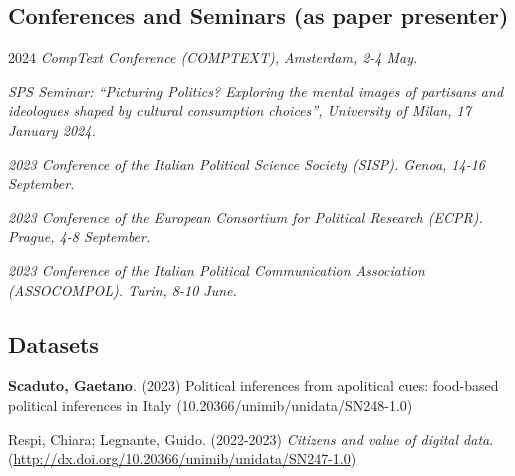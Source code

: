 \documentclass[8pt,]{article}
\providecommand{\tightlist}{%
  \setlength{\itemsep}{0pt}\setlength{\parskip}{0pt}}
\renewenvironment{itemize}{
  \begin{list}{}{
    \setlength{\leftmargin}{1.5em}
  }
}{
  \end{list}
}
\begin{document}
\hypertarget{conferences-and-seminars-as-paper-presenter}{%
\subsection{Conferences and Seminars (as paper
presenter)}\label{conferences-and-seminars-as-paper-presenter}}

\begin{itemize}
\tightlist
\item
  2024 \emph{CompText Conference (COMPTEXT), Amsterdam, 2-4 May.}
\end{itemize}

\begin{itemize}
\tightlist
\item
  \emph{SPS Seminar: ``Picturing Politics? Exploring the mental images
  of partisans and ideologues shaped by cultural consumption choices'',
  University of Milan, 17 January 2024.}
\end{itemize}

\begin{itemize}
\tightlist
\item
  \emph{2023 Conference of the Italian Political Science Society (SISP).
  Genoa, 14-16 September.}
\end{itemize}

\begin{itemize}
\tightlist
\item
  \emph{2023 Conference of the European Consortium for Political
  Research (ECPR). Prague, 4-8 September.}
\end{itemize}

\begin{itemize}
\tightlist
\item
  \emph{2023 Conference of the Italian Political Communication
  Association (ASSOCOMPOL). Turin, 8-10 June.}
\end{itemize}

\hypertarget{datasets}{%
\subsection{Datasets}\label{datasets}}

\begin{itemize}
\item
  \textbf{Scaduto, Gaetano}. (2023) Political inferences from apolitical
  cues: food-based political inferences in Italy
  (10.20366/unimib/unidata/SN248-1.0)
\item
  Respi, Chiara; Legnante, Guido. (2022-2023) \emph{Citizens and value
  of digital data}.
  (\url{http://dx.doi.org/10.20366/unimib/unidata/SN247-1.0})
\end{itemize}
\end{document}
